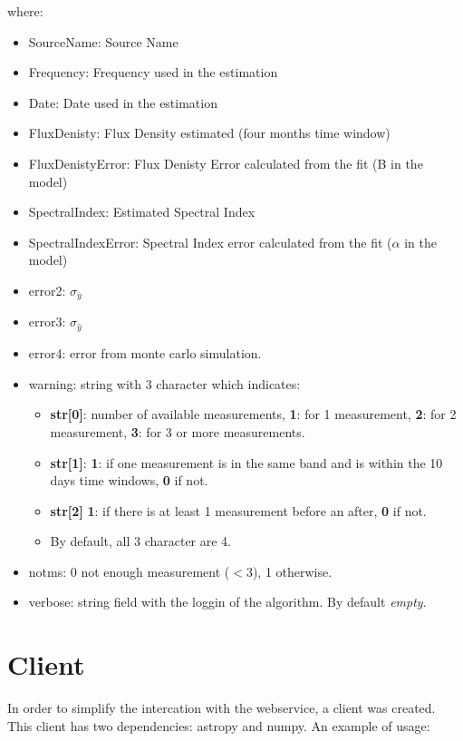 \documentclass[10pt]{article}
\begin{document}
\noindent where:
\begin{itemize}
    \item SourceName: Source Name
    \item Frequency: Frequency used in the estimation
    \item Date: Date used in the estimation
    \item FluxDenisty: Flux Density estimated (four months time window)
    \item FluxDenistyError: Flux Denisty Error calculated from the fit (B in the model)
    \item SpectralIndex: Estimated Spectral Index 
    \item SpectralIndexError: Spectral Index error calculated from the fit ($\alpha$ in the model)
    \item error2: $\sigma_{\bar{y}}$ %
    \item error3: $\sigma_{\hat{y}}$
    \item error4: error from monte carlo simulation.
    \item warning: string with 3 character which indicates:
        \begin{itemize} 
            \item \textbf{str[0]}: number of available measurements, \textbf{1}: for 1 measurement, \textbf{2}: for 2 measurement, \textbf{3}: for 3 or more measurements.
            \item \textbf{str[1]}: \textbf{1}: if one measurement is in the same band and is within the 10 days time windows, \textbf{0} if not.
            \item \textbf{str[2]} \textbf{1}: if there is at least 1 measurement before an after, \textbf{0} if not.
            \item By default, all 3 character are 4.
        \end{itemize}
    \item notms: 0 not enough measurement ($<$3), 1 otherwise.
    \item verbose: string field with the loggin of the algorithm. By default \emph{empty}.
\end{itemize}

\section{Client}
In order to simplify the intercation with the webservice, a client was created.
This client has two dependencies: astropy and numpy. An example of usage:
\end{document}
